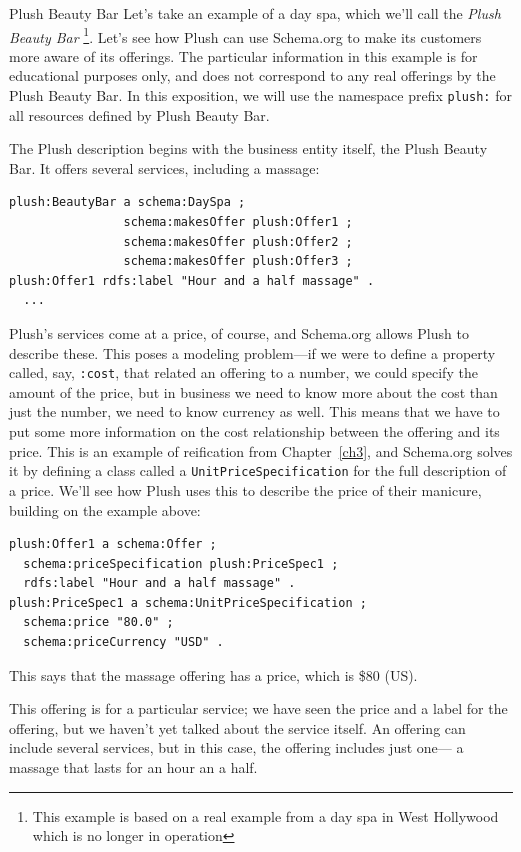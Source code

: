 \begin{example}{Plush Beauty Bar}
\label{Plushex}
Let's take an example of a day spa, which we'll call the 
\emph{Plush Beauty Bar} \footnote{This example is based on a real example from 
a day spa in West Hollywood which is no longer in operation}.   Let's see how
Plush can use Schema.org to make its customers more aware of its
offerings. 
The particular information in this example is
for educational purposes only, and does not correspond to any real
offerings by the Plush Beauty Bar. In this exposition, we will use the
namespace prefix \texttt{plush:} for all resources defined by Plush Beauty Bar.

The Plush description begins with the business entity itself, the
Plush Beauty Bar. It offers several services,
including a massage:

\begin{lstlisting}
plush:BeautyBar a schema:DaySpa ;
                schema:makesOffer plush:Offer1 ;
                schema:makesOffer plush:Offer2 ;
                schema:makesOffer plush:Offer3 ;
plush:Offer1 rdfs:label "Hour and a half massage" .
  ...
\end{lstlisting}


Plush's services come at a price, of course, and Schema.org allows Plush to
describe these.   This poses a modeling problem---if we were to
define a property called, say, \texttt{:cost}, that related an offering to a
number, we could specify the amount of the price, but in business we
need to know more about the cost than just the number, we need to know
currency as well. This means that we have to put some more information
on the cost relationship between the offering and its price. This is an
example of reification from Chapter~\ref{ch3}, and Schema.org
solves it by defining a
class called a \texttt{UnitPriceSpecification} for the full description of a
price. We'll see how Plush uses this to describe the price of their
manicure, building on the example above:

\begin{lstlisting}
plush:Offer1 a schema:Offer ;
  schema:priceSpecification plush:PriceSpec1 ;
  rdfs:label "Hour and a half massage" .
plush:PriceSpec1 a schema:UnitPriceSpecification ;
  schema:price "80.0" ;
  schema:priceCurrency "USD" .
\end{lstlisting}

This says that the massage offering has a price, which is \$80 (US).

This offering is for a particular service; we have seen the price and 
a label for the offering, 
but we haven't yet talked about the service itself.  An
offering can include several services, but in this case, the offering
includes just one--- a massage that lasts for an hour an a half.  


\end{example}
